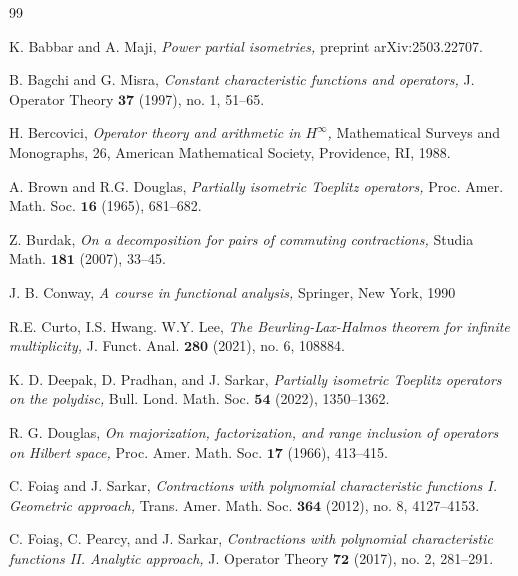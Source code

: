 \documentclass[12pt]{amsart}
\theoremstyle{definition}
\theoremstyle{plain}
\theoremstyle{definition}
\numberwithin{equation}{section}
\begin{document}
\label{Ref}
\begin{thebibliography}{99}

{K. Babbar and A. Maji,}  
{\it Power partial isometries,} {preprint arXiv:2503.22707.}

{B. Bagchi and G. Misra,}
{\it Constant characteristic functions and operators,}
{J. Operator Theory $\bm{37}$ (1997),  no. 1, 51--65.}


{H. Bercovici,} 
{\it Operator theory and arithmetic in $H^{\infty}$,} 
{Mathematical Surveys and Monographs, 26, American Mathematical Society, Providence, RI, 1988.}



{A. Brown and R.G. Douglas,}
{\it Partially isometric Toeplitz operators,} 
{Proc. Amer. Math. Soc. $\bm{16}$ (1965), 681--682.}



{Z. Burdak,}
{\it On a decomposition for pairs of commuting contractions,}
{Studia Math. $\bm{181}$ (2007), 33--45.}
 
 {J. B. Conway,}
 {\it A course in functional analysis,}
 {Springer, New York, 1990}
 
 {R.E. Curto, I.S. Hwang. W.Y. Lee,}
 {\it  The Beurling-Lax-Halmos theorem for infinite multiplicity,}
 {J. Funct. Anal. $\bm{280}$ (2021), no. 6, 108884.}

{K. D. Deepak, D. Pradhan, and J. Sarkar,} 
{\it Partially isometric Toeplitz operators on the polydisc,} 
{Bull. Lond. Math. Soc. $\bm{54}$ (2022), 1350--1362.} 


{R. G. Douglas,}
{\it On majorization, factorization, and range inclusion of operators on Hilbert space,}
{Proc. Amer. Math. Soc. $\bm{17}$ (1966), 413--415.}

{C. Foia\c{s} and J. Sarkar,} 
{\it Contractions with polynomial characteristic functions I. Geometric approach,}
{Trans. Amer. Math. Soc. $\bm{364}$ (2012), no. 8, 4127--4153.}


 {C. Foia\c{s}, C. Pearcy, and J. Sarkar,} 
{\it Contractions with polynomial characteristic functions II. Analytic approach,}
 {J. Operator Theory $\bm{72}$ (2017), no. 2,  281--291.}


\end{thebibliography}
\end{document}
